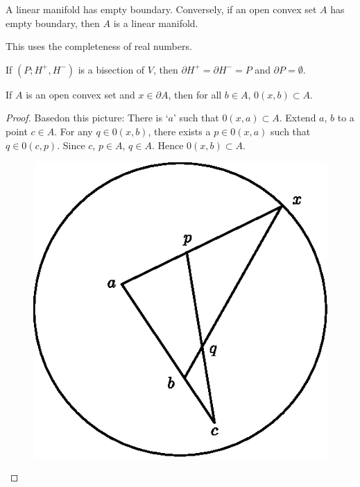 \begin{ex}\label{chap1-ex1.4.2}
A linear manifold has empty boundary. Conversely, if an open convex set $A$ has empty boundary, then $A$ is a linear manifold.
\end{ex}

\begin{remark*}
This uses the completeness of real numbers.
\end{remark*}

\begin{ex}\label{chap1-ex1.4.3}
If $(P;H^{+},H^{-})$ is a bisection of $V$, then $\partial H^{+}=\partial H^{-}=P$ and $\partial P=\emptyset$.
\end{ex}

\begin{proposition}\label{chap1-prop1.4.4}
If $A$ is an open convex set and $x\in \partial A$, then for all $b\in A$, $0(x,b)\subset A$.
\end{proposition}

\begin{proof}
Based\pageoriginale on this picture: There is `$a$' such that $0(x,a)\subset A$. Extend $a$, $b$ to a point $c\in A$. For any $q\in 0(x,b)$, there exists a $p\in 0(x,a)$ such that $q\in 0(c,p)$. Since $c$, $p\in A$, $q\in A$. Hence $0(x,b)\subset A$.
\begin{figure}[H]
\centering
\includegraphics{figure/fig2.eps}
\end{figure}
\end{proof}

